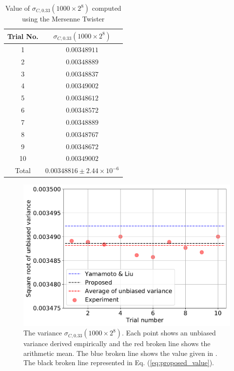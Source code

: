 \documentclass[dvipdfmx,english]{ampmt} %
\begin{document}
\begin{table}[tbp]
  \centering
  \caption{Value of $\sigma_{C,0.33}(1000\times 2^8)$ computed using the Mersenne Twister}
  \begin{tabular}{cc} \hline
    Trial No.   & $\sigma_{C,0.33}(1000\times 2^8)$           \\ \hline 
    1           & $0.00348911$       \\
    2           & $0.00348889$       \\
    3           & $0.00348837$       \\ 
    4           & $0.00349002$       \\ 
    5           & $0.00348612$       \\ 
    6           & $0.00348572$       \\ 
    7           & $0.00348889$       \\ 
    8           & $0.00348767$       \\ 
    9           & $0.00348672$       \\ 
    10          & $0.00349002$       \\ \hline 
    Total       & $0.00348816 \pm 2.44 \times 10^{-6}$ \\ \hline
  \end{tabular}
  \label{tab:3}
\end{table}
%
\begin{figure}[tbp]
  \centering
  \includegraphics[width=0.7\linewidth]{./figure/unbiased_variance.pdf}
  \caption{The variance $\sigma_{C,0.33}(1000\times 2^8)$. Each point shows an unbiased variance derived empirically and the red broken line shows the arithmetic mean. The blue broken line shows the value given in \cite{yamamoto2016highly}. The black broken line represented in Eq. (\ref{eq:proposed_value}).}
  \label{fig:comparison_yamamoto}
\end{figure}
\clearpage
\end{document}
